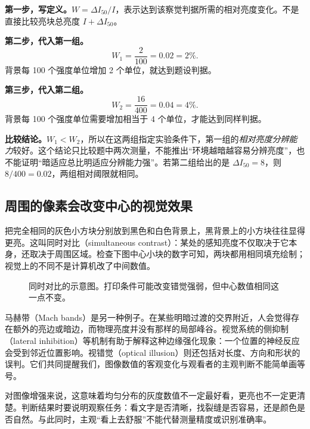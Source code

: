 \textbf{第一步，写定义。}$W=\Delta I_{50}/I$，表示达到该察觉判据所需的相对亮度变化。不是直接比较亮块总亮度 $I+\Delta I_{50}$。

\textbf{第二步，代入第一组。}
\[
 W_1=\frac{2}{100}=0.02=2\%.
\]
背景每 100 个强度单位增加 2 个单位，就达到题设判据。

\textbf{第三步，代入第二组。}
\[
 W_2=\frac{16}{400}=0.04=4\%.
\]
背景每 100 个强度单位需要增加相当于 4 个单位，才能达到同样判据。

\textbf{比较结论。}$W_1<W_2$，所以在这两组指定实验条件下，第一组的\emph{相对亮度分辨能力}较好。这个结论只比较题中两次测量，不能推出“环境越暗越容易分辨亮度”，也不能证明“暗适应总比明适应分辨能力强”。若第二组给出的是 $\Delta I_{50}=8$，则 $8/400=0.02$，两组相对阈限就相同。

\subsection{周围的像素会改变中心的视觉效果}

把完全相同的灰色小方块分别放到黑色和白色背景上，黑背景上的小方块往往显得更亮。这叫同时对比（simultaneous contrast）：某处的感知亮度不仅取决于它本身，还取决于周围区域。检查下图中心小块的数字可知，两块都用相同填充绘制；视觉上的不同不是计算机改了中间数值。

\begin{figure}[htbp]
\centering
{}
\caption{同时对比的示意图。打印条件可能改变错觉强弱，但中心数值相同这一点不变。}
\end{figure}

马赫带（Mach bands）是另一种例子。在某些明暗过渡的交界附近，人会觉得存在额外的亮边或暗边，而物理亮度并没有那样的局部峰谷。视觉系统的侧抑制（lateral inhibition）等机制有助于解释这种边缘强化现象：一个位置的神经反应会受到邻近位置影响。视错觉（optical illusion）则还包括对长度、方向和形状的误判。它们共同提醒我们，图像数值的客观变化与观看者的主观判断不能简单画等号。

对图像增强来说，这意味着均匀分布的灰度数值不一定最好看，更亮也不一定更清楚。判断结果时要说明观察任务：看文字是否清晰，找裂缝是否容易，还是颜色是否自然。与此同时，主观“看上去舒服”不能代替测量精度或识别准确率。

